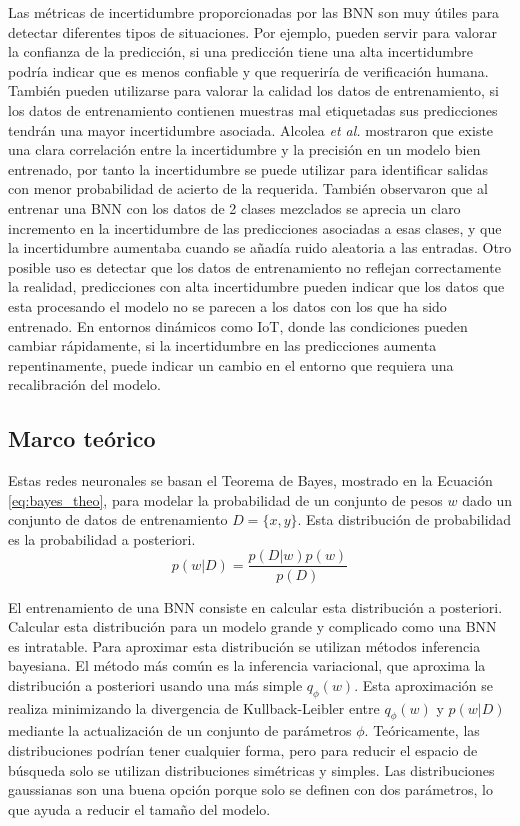 Las métricas de incertidumbre proporcionadas por las BNN son muy útiles para detectar diferentes tipos de situaciones. Por ejemplo, pueden servir para valorar la confianza de la predicción, si una predicción tiene una alta incertidumbre podría indicar que es menos confiable y que requeriría de verificación humana. También pueden utilizarse para valorar la calidad los datos de entrenamiento, si los datos de entrenamiento contienen muestras mal etiquetadas sus predicciones tendrán una mayor incertidumbre asociada. Alcolea \emph{et al.} \cite{bnn_hyper_uncertainty} mostraron que existe una clara correlación entre la incertidumbre y la precisión en un modelo bien entrenado, por tanto la incertidumbre se puede utilizar para identificar salidas con menor probabilidad de acierto de la requerida. También observaron que al entrenar una BNN con los datos de 2 clases mezclados se aprecia un claro incremento en la incertidumbre de las predicciones asociadas a esas clases, y que la incertidumbre aumentaba cuando se añadía ruido aleatoria a las entradas. Otro posible uso es detectar que los datos de entrenamiento no reflejan correctamente la realidad, predicciones con alta incertidumbre pueden indicar que los datos que esta procesando el modelo no se parecen a los datos con los que ha sido entrenado. En entornos dinámicos como IoT, donde las condiciones pueden cambiar rápidamente, si la incertidumbre en las predicciones aumenta repentinamente, puede indicar un cambio en el entorno que requiera una recalibración del modelo.

\subsection{Marco teórico} \label{sec:bnn_formulas}

Estas redes neuronales se basan el Teorema de Bayes,  mostrado en la Ecuación \ref{eq:bayes_theo}, para modelar la probabilidad de un conjunto de pesos $w$ dado un conjunto de datos de entrenamiento $D = \{x, y\}$. Esta distribución de probabilidad es la probabilidad a posteriori.
\begin{equation} \label{eq:bayes_theo}
p(w|D) = \dfrac{p(D|w) p(w)}{p(D)}
\end{equation}

El entrenamiento de una BNN consiste en calcular esta distribución a posteriori. Calcular esta distribución para un modelo grande y complicado como una BNN es intratable. Para aproximar esta distribución se utilizan métodos inferencia bayesiana. El método más común es la inferencia variacional, que aproxima la distribución a posteriori usando una más simple $q_{\phi}(w)$. Esta aproximación se realiza minimizando la divergencia de Kullback-Leibler \cite{kl_divergence} entre $q_{\phi}(w)$ y $p(w|D)$ mediante la actualización de un conjunto de parámetros $\phi$. Teóricamente, las distribuciones podrían tener cualquier forma, pero para reducir el espacio de búsqueda solo se utilizan distribuciones simétricas y simples. Las distribuciones gaussianas son una buena opción porque solo se definen con dos parámetros, lo que ayuda a reducir el tamaño del modelo.

